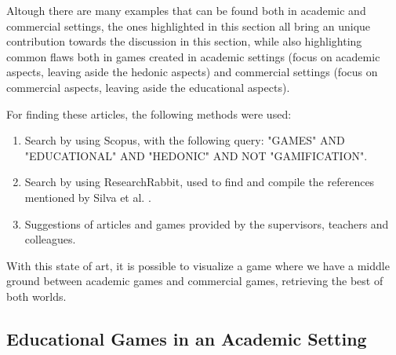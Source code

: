 Altough there are many examples that can be found both in academic and commercial settings, the ones highlighted in this section all bring an unique contribution towards the discussion in this section, while also highlighting common flaws both in games created in academic settings (focus on academic aspects, leaving aside the hedonic aspects) and commercial settings (focus on commercial aspects, leaving aside the educational aspects).

For finding these articles, the following methods were used:

\begin{enumerate}
    \item Search by using Scopus, with the following query: "GAMES" AND "EDUCATIONAL" AND "HEDONIC" AND NOT "GAMIFICATION".
    \item Search by using ResearchRabbit, used to find and compile the references mentioned by Silva et al. \cite{daSilva2025}.
    \item Suggestions of articles and games provided by the supervisors, teachers and colleagues.
\end{enumerate}

With this state of art, it is possible to visualize a game where we have a middle ground between academic games and commercial games, retrieving the best of both worlds.

\subsection{Educational Games in an Academic Setting}

